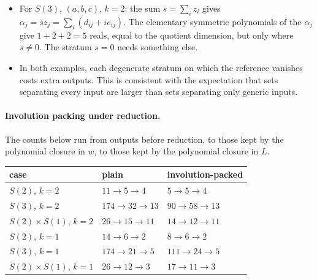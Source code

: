 \documentclass[11pt]{article}
\theoremstyle{definition}
\theoremstyle{remark}
\begin{document}
\begin{enumerate}
\begin{itemize}
        $\alpha = \bar p a = d_{ap} + i e_{ap}$ and
        $\beta = \bar p b = d_{bp} + i e_{bp}$. When $p \ne 0$ the orbit is
        determined by $|p|^2 = d_{pp}$ and the unordered pair
        $\{\alpha, \beta\}$, and so by $d_{pp}$, $\alpha + \beta$ and
        $\alpha\beta$. That is 5 reals, equal to the quotient dimension, each
        of degree~2 in $w$.
        \begin{itemize}
          \item When $p = 0$, $\alpha = \beta = 0$ carries nothing. Adding the 4
            outputs of $S(2)$, $k = 2$ for $(a, b)$ covers that stratum, and
            $d_{pp}$ shows which case applies. That gives 9 outputs that
            separate every input, by a short decoder argument (Level~2c),
            against 11 from the polynomial closure.
        \end{itemize}
      \item For $S(3)$, $(a, b, c)$, $k = 2$: the sum $s = \sum_i z_i$ gives
        $\alpha_j = \bar s z_j = \sum_i (d_{ij} + i e_{ij})$. The elementary
        symmetric polynomials of the $\alpha_j$ give $1 + 2 + 2 = 5$ reals,
        equal to the quotient dimension, but only where $s \ne 0$. The stratum
        $s = 0$ needs something else.
      \item In both examples, each degenerate stratum on which the reference
        vanishes costs extra outputs. This is consistent with the expectation
        that sets separating every input are larger than sets separating only
        generic inputs.
    \end{itemize}
\end{enumerate}

\paragraph{Involution packing under reduction.}
The counts below run from outputs before reduction, to those kept by the
polynomial closure in $w$, to those kept by the polynomial closure in $L$.

\begin{center}
\begin{tabular}{lll}
  case & plain & involution-packed \\ \hline
  $S(2)$, $k=2$             & $11 \to 5 \to 4$    & $5 \to 5 \to 4$ \\
  $S(3)$, $k=2$             & $174 \to 32 \to 13$ & $90 \to 58 \to 13$ \\
  $S(2)\times S(1)$, $k=2$  & $26 \to 15 \to 11$  & $14 \to 12 \to 11$ \\
  $S(2)$, $k=1$             & $14 \to 6 \to 2$    & $8 \to 6 \to 2$ \\
  $S(3)$, $k=1$             & $174 \to 21 \to 5$  & $111 \to 24 \to 5$ \\
  $S(2)\times S(1)$, $k=1$  & $26 \to 12 \to 3$   & $17 \to 11 \to 3$
\end{tabular}
\end{center}
\end{document}
